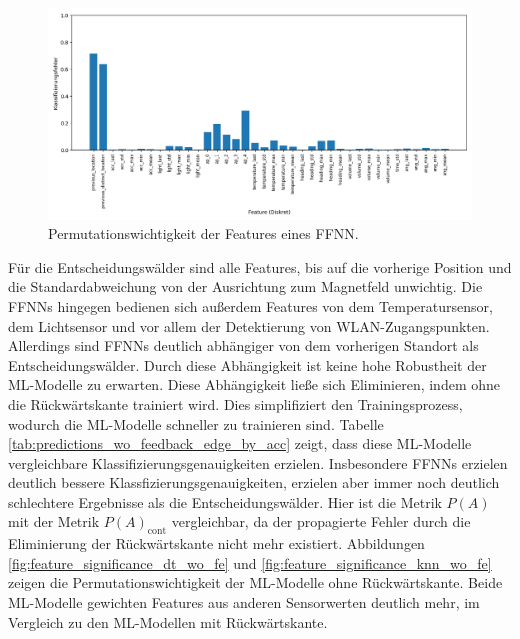 \begin{figure}[h!]
    \centering
    \includegraphics[width=\linewidth]{images/evaluation_feature_importance_knn_pi.png}
    \caption{Permutationswichtigkeit der Features eines FFNN.}
    \label{fig:feature_significance_knn}
\end{figure}
\newline
\newline
Für die Entscheidungswälder sind alle Features, bis auf die vorherige Position und die Standardabweichung von der Ausrichtung zum Magnetfeld unwichtig.
Die FFNNs hingegen bedienen sich außerdem Features von dem Temperatursensor, dem Lichtsensor und vor allem der Detektierung von WLAN-Zugangspunkten.
Allerdings sind FFNNs deutlich abhängiger von dem vorherigen Standort als Entscheidungswälder.
\newline
\newline
Durch diese Abhängigkeit ist keine hohe Robustheit der ML-Modelle zu erwarten.
Diese Abhängigkeit ließe sich Eliminieren, indem ohne die Rückwärtskante trainiert wird.
Dies simplifiziert den Trainingsprozess, wodurch die ML-Modelle schneller zu trainieren sind.
Tabelle \ref{tab:predictions_wo_feedback_edge_by_acc} zeigt, dass diese ML-Modelle vergleichbare Klassifizierungsgenauigkeiten erzielen.
Insbesondere FFNNs erzielen deutlich bessere Klassfizierungsgenauigkeiten, erzielen aber immer noch deutlich schlechtere Ergebnisse als die Entscheidungswälder.
Hier ist die Metrik $P(A)$ mit der Metrik $P(A)_{\text{cont}}$ vergleichbar, da der propagierte Fehler durch die Eliminierung der Rückwärtskante nicht mehr existiert.
\newline
\newline
Abbildungen \ref{fig:feature_significance_dt_wo_fe} und \ref{fig:feature_significance_knn_wo_fe} zeigen die Permutationswichtigkeit der ML-Modelle ohne Rückwärtskante.
Beide ML-Modelle gewichten Features aus anderen Sensorwerten deutlich mehr, im Vergleich zu den ML-Modellen mit Rückwärtskante.
